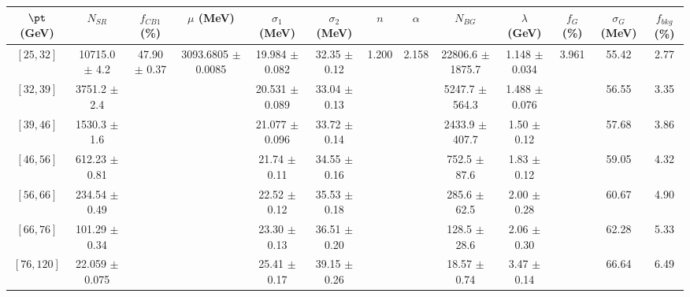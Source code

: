\begin{tabular}{c||c|c|c|c|c|c|c|c|c|c|c||c}
$\pt$ (GeV) & $N_{SR}$ & $f_{CB1}$ (\%) & $\mu$ (MeV) & $\sigma_1$ (MeV) & $\sigma_2$ (MeV) & $n$ & $\alpha$ & $N_{BG}$ & $\lambda$ (GeV) & $f_G$ (\%) & $\sigma_G$ (MeV) & $f_{bkg}$ (\%) \\
\hline
$[25, 32]$ & 10715.0 $\pm$ 4.2 & \multirow{7}{*}{47.90 $\pm$ 0.37} & \multirow{7}{*}{3093.6805 $\pm$ 0.0085} & 19.984 $\pm$ 0.082 & 32.35 $\pm$ 0.12 & \multirow{7}{*}{1.200} & \multirow{7}{*}{2.158} & 22806.6 $\pm$ 1875.7 & 1.148 $\pm$ 0.034 & \multirow{7}{*}{3.961} & 55.42 & 2.77\\
$[32, 39]$ & 3751.2 $\pm$ 2.4 &  &  & 20.531 $\pm$ 0.089 & 33.04 $\pm$ 0.13 &  &  & 5247.7 $\pm$ 564.3 & 1.488 $\pm$ 0.076 &  & 56.55 & 3.35\\
$[39, 46]$ & 1530.3 $\pm$ 1.6 &  &  & 21.077 $\pm$ 0.096 & 33.72 $\pm$ 0.14 &  &  & 2433.9 $\pm$ 407.7 & 1.50 $\pm$ 0.12 &  & 57.68 & 3.86\\
$[46, 56]$ & 612.23 $\pm$ 0.81 &  &  & 21.74 $\pm$ 0.11 & 34.55 $\pm$ 0.16 &  &  & 752.5 $\pm$ 87.6 & 1.83 $\pm$ 0.12 &  & 59.05 & 4.32\\
$[56, 66]$ & 234.54 $\pm$ 0.49 &  &  & 22.52 $\pm$ 0.12 & 35.53 $\pm$ 0.18 &  &  & 285.6 $\pm$ 62.5 & 2.00 $\pm$ 0.28 &  & 60.67 & 4.90\\
$[66, 76]$ & 101.29 $\pm$ 0.34 &  &  & 23.30 $\pm$ 0.13 & 36.51 $\pm$ 0.20 &  &  & 128.5 $\pm$ 28.6 & 2.06 $\pm$ 0.30 &  & 62.28 & 5.33\\
$[76, 120]$ & 22.059 $\pm$ 0.075 &  &  & 25.41 $\pm$ 0.17 & 39.15 $\pm$ 0.26 &  &  & 18.57 $\pm$ 0.74 & 3.47 $\pm$ 0.14 &  & 66.64 & 6.49\\
\end{tabular}
